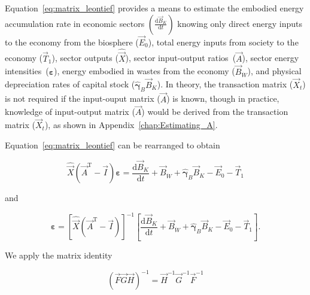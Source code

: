 Equation~\ref{eq:matrix_leontief} provides a means to 
estimate the embodied energy accumulation rate
in economic sectors $\left(\frac{\mathrm{d}\vec{B}_{K}}{\mathrm{d}t}\right)$ 
knowing only 
direct energy inputs to the economy from the biosphere ($\vec{E}_{0}$), 
total energy inputs from society to the economy ($\vec{T}_{1}$),
sector outputs ($\hat{\vec{X}}$), 
sector input-output ratios~($\vec{A}$), 
sector energy intensities~($\boldsymbol{\varepsilon}$), 
energy embodied in wastes from the economy ($\vec{B}_{\dot{W}}$),
and physical depreciation rates of capital stock ($\hat{\boldsymbol{\gamma}}_{B}\vec{B}_{K}$). 
In theory, the transaction matrix ($\vec{X}_{t}$) is not required 
if the input-ouput matrix ($\vec{A}$) is known, 
though in practice, 
knowledge of input-output matrix ($\vec{A}$) 
would be derived from the transaction matrix ($\vec{X}_{t}$),
as shown in Appendix~\ref{chap:Estimating_A}.



Equation~\ref{eq:matrix_leontief} can be rearranged to obtain

\begin{equation} \label{eq:epsilon_derivation_1}
	\hat{\vec{X}} (\vec{A}^{\mathrm{T}} - \vec{I}) \boldsymbol{\varepsilon}
	= \frac{\mathrm{d}\vec{B}_{K}}{\mathrm{d}t}
	+ \vec{B}_{\dot{W}}
	+ \hat{\boldsymbol{\gamma}}_{B} \vec{B}_{K}
	- \vec{E}_{0}
	- \vec{T}_{1} 
\end{equation}

\noindent{}and

\begin{equation} \label{eq:epsilon_derivation_2}
	\boldsymbol{\varepsilon}
	= {\left[ \hat{\vec{X}} (\vec{A}^{\mathrm{T}} - \vec{I}) \right]}^{-1}
		\left[
			\frac{\mathrm{d}\vec{B}_{K}}{\mathrm{d}t}
			+ \vec{B}_{\dot{W}}
			+ \hat{\boldsymbol{\gamma}}_{B} \vec{B}_{K}
			- \vec{E}_{0}
			- \vec{T}_{1} 
		\right].
\end{equation}

\noindent{}We apply the matrix identity 
\cite[Formula~6.2, p.~308]{Beyer:1991vd}

\begin{equation} \label{eq:matrix_identity_Beyer}
	{\left(\vec{F}\vec{G}\vec{H}\right)}^{-1} 
	= \vec{H}^{-1} \vec{G}^{-1} \vec{F}^{-1}
\end{equation}

